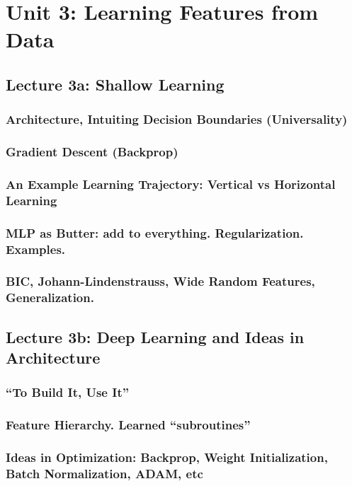 \documentclass[12pt]{article}
\begin{document}
  \section*{\sc Unit 3: Learning Features from Data}
    \subsection*{Lecture 3a: Shallow Learning} %
      \subsubsection*{Architecture, Intuiting Decision Boundaries (Universality)}
      \subsubsection*{Gradient Descent (Backprop)}
      \subsubsection*{An Example Learning Trajectory: Vertical vs Horizontal Learning}
      \subsubsection*{MLP as Butter: add to everything.  Regularization.  Examples.}
      \subsubsection*{BIC, Johann-Lindenstrauss, Wide Random Features, Generalization.}
    \newpage

    \subsection*{Lecture 3b: Deep Learning and Ideas in Architecture} %
      \subsubsection*{``To Build It, Use It''}
      \subsubsection*{Feature Hierarchy.  Learned ``subroutines''}
      \subsubsection*{Ideas in Optimization: Backprop, Weight Initialization, Batch Normalization, ADAM, etc}
\end{document}
